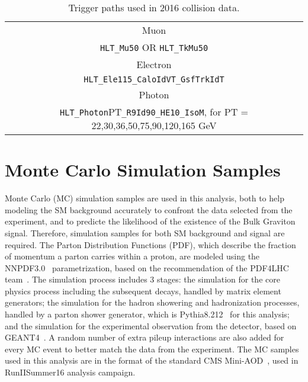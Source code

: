 \begin{table}[htbp!]
\begin{small}
   \caption{Trigger paths used in 2016 collision data.
   \label{tab:triggerPaths}}
   \centering
   \begin{tabular}{ c }
\hline\hline
Muon  \\ \texttt{HLT\_Mu50} OR \texttt{HLT\_TkMu50}  \\ \hline
Electron \\ \texttt{HLT\_Ele115\_CaloIdVT\_GsfTrkIdT} \\ \hline
Photon \\ \texttt{HLT\_Photon}PT\texttt{\_R9Id90\_HE10\_IsoM},  for PT = 22,30,36,50,75,90,120,165 GeV \\  
\hline
\hline
    \end{tabular}
\end{small}
\end{table}


\section{Monte Carlo Simulation Samples}
Monte Carlo (MC) simulation samples are used in this analysis, both to help modeling the SM background accurately to confront the data selected from the experiment, and to predicte the likelihood of the existence of the Bulk Graviton signal. Therefore, simulation samples for both SM background and signal are required. The Parton Distribution Functions (PDF), which describe the fraction of momentum a parton carries within a proton, are modeled using the NNPDF3.0~\cite{sample_nnpdf30} parametrization, based on the recommendation of the PDF4LHC team~\cite{sample_pdf4lhc}. The simulation process includes 3 stages: the simulation for the core physics process including the subsequent decays, handled by matrix element generators; the simulation for the hadron showering and hadronization processes, handled by a parton shower generator, which is Pythia8.212~\cite{sample_pythia} for this analysis; and the simulation for the experimental observation from the detector, based on GEANT4~\cite{sample_geant4}. A random number of extra pileup interactions are also added for every MC event to better match the data from the experiment. The MC samples used in this analysis are in the format of the standard CMS Mini-AOD~\cite{sample_miniaod}, used in RunIISummer16 analysis campaign.

